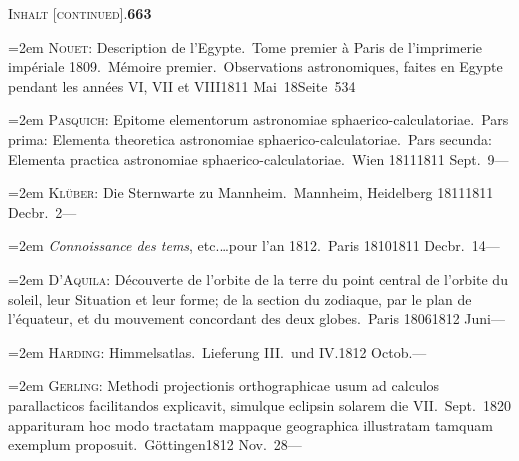 \documentclass[12pt,a4paper]{article}
\begin{document}
{{{{{{{{{{{{{\newpage

\begin{center}\small\textsc{Inhalt [continued].}\quad\textbf{663}\end{center}

\vspace{0.3cm}

{\small
\noindent\hangindent=2em
\textsc{Nouet}: Description de l'Egypte.\ Tome premier \`a Paris de l'imprimerie imp\'eriale 1809.\ M\'emoire premier.\ Observations astronomiques, faites en Egypte pendant les ann\'ees VI, VII et VIII\hfill 1811 Mai\ 18\quad Seite\ 534

\vspace{0.5mm}
\noindent\hangindent=2em
\textsc{Pasquich}: Epitome elementorum astronomiae sphaerico-calculatoriae.\ Pars prima: Elementa theoretica astronomiae sphaerico-calculatoriae.\ Pars secunda: Elementa practica astronomiae sphaerico-calculatoriae.\ Wien 1811\hfill 1811 Sept.\ 9\quad ---

\vspace{0.5mm}
\noindent\hangindent=2em
\textsc{Kl\"uber}: Die Sternwarte zu Mannheim.\ Mannheim, Heidelberg 1811\hfill 1811 Decbr.\ 2\quad ---

\vspace{0.5mm}
\noindent\hangindent=2em
\textit{Connoissance des tems}, etc.\dots pour l'an 1812.\ Paris 1810\hfill 1811 Decbr.\ 14\quad ---

\vspace{0.5mm}
\noindent\hangindent=2em
\textsc{D'Aquila}: D\'ecouverte de l'orbite de la terre du point central de l'orbite du soleil, leur Situation et leur forme; de la section du zodiaque, par le plan de l'\'equateur, et du mouvement concordant des deux globes.\ Paris 1806\hfill 1812 Juni\quad ---

\vspace{0.5mm}
\noindent\hangindent=2em
\textsc{Harding}: Himmelsatlas.\ Lieferung III.\ und IV.\hfill 1812 Octob.\quad ---

\vspace{0.5mm}
\noindent\hangindent=2em
\textsc{Gerling}: Methodi projectionis orthographicae usum ad calculos parallacticos facilitandos explicavit, simulque eclipsin solarem die VII.\ Sept.\ 1820 apparituram hoc modo tractatam mappaque geographica illustratam tamquam exemplum proposuit.\ G\"ottingen\hfill 1812 Nov.\ 28\quad ---

}}}}}}}}}}}}}}
\end{document}
